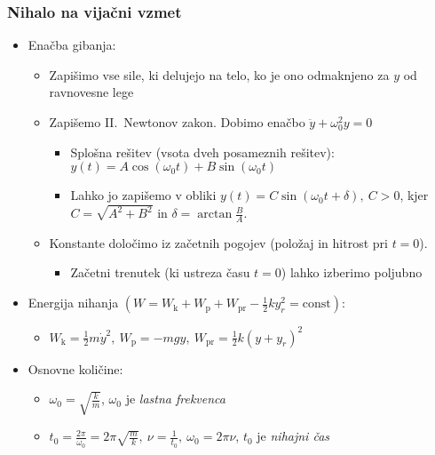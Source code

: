 \subsubsection*{Nihalo na vijačni vzmet}
\begin{itemize}
    \item Enačba gibanja:
    \begin{itemize}
        \item Zapišimo vse sile, ki delujejo na telo, ko je ono odmaknjeno za \(y\) od ravnovesne lege
        \item Zapišemo II.\ Newtonov zakon. Dobimo enačbo \(\ddot{y} + \omega_0^2y = 0\)
        \begin{itemize}
            \item Splošna rešitev (vsota dveh posameznih rešitev): \(y(t) = A \cos (\omega_0t) + B \sin (\omega_0t)\)
            \item Lahko jo zapišemo v obliki \(y(t) = C \sin(\omega_0 t + \delta), \ C > 0\), kjer \(C = \sqrt{A^2 + B^2}\) in \(\delta = \arctan \frac{B}{A}\).
        \end{itemize}
        \item Konstante določimo iz začetnih pogojev (položaj in hitrost pri \(t = 0\)). 
        \begin{itemize}
            \item Začetni trenutek (ki ustreza času \(t = 0\)) lahko izberimo poljubno
        \end{itemize}
    \end{itemize}
    \item Energija nihanja \((W = W_\text{k} + W_\text{p} + W_\text{pr} - \frac{1}{2} k y_r^2 = \text{const})\):
    \begin{itemize}
        \item \(W_\text{k} = \frac{1}{2}m \dot{y}^2, \  W_\text{p} = -mgy, \ W_\text{pr} = \frac{1}{2}k (y + y_r)^2\)
    \end{itemize}
    \item Osnovne količine:
    \begin{itemize}
        \item \(\omega_0 = \sqrt{\frac{k}{m}}\), \(\omega_0\) je \emph{lastna frekvenca}
        \item \(t_0 = \frac{2 \pi}{\omega_0} = 2 \pi \sqrt{\frac{m}{k}}, \ \nu = \frac{1}{t_0}, \ \omega_0 = 2 \pi \nu\), \(t_0\) je \emph{nihajni čas}
    \end{itemize}
\end{itemize}

